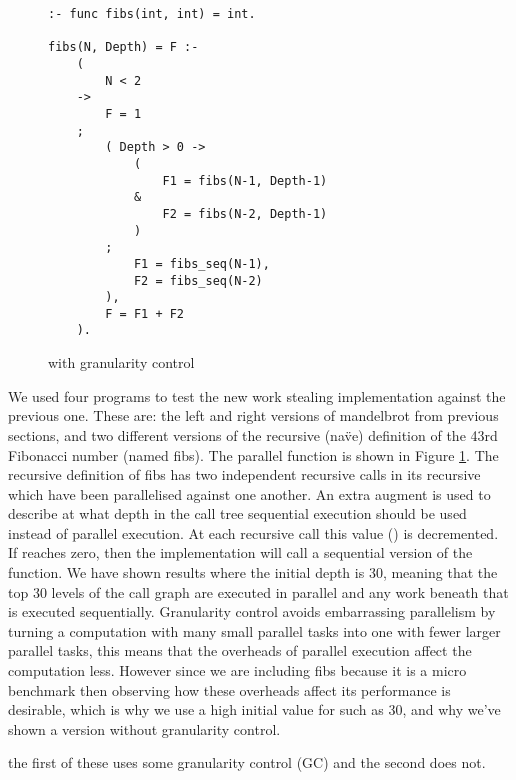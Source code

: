
\begin{figure}
\begin{verbatim}
:- func fibs(int, int) = int.

fibs(N, Depth) = F :-
    (
        N < 2
    ->
        F = 1
    ;
        ( Depth > 0 ->
            (
                F1 = fibs(N-1, Depth-1)
            &
                F2 = fibs(N-2, Depth-1)
            )
        ;
            F1 = fibs_seq(N-1),
            F2 = fibs_seq(N-2)
        ),
        F = F1 + F2
    ).
\end{verbatim}
\caption{\fibs with granularity control}
\label{fig:fibs}
\end{figure}

We used four programs to test the new work stealing implementation against
the previous one.
These are:
the left and right versions of mandelbrot from previous sections,
and two different versions of the recursive (na\"ve) definition of the 43rd
Fibonacci number (named fibs).
The parallel \fibs function is shown in Figure \ref{fig:fibs}.
The recursive definition of fibs has two independent recursive calls in its
recursive which have been parallelised against one another.
An extra augment is used to describe at what depth in the call tree
sequential execution should be used instead of parallel execution.
At each recursive call this value () is decremented.
If  reaches zero, then the implementation will call a sequential
version of the \fibs function.
We have shown results where the initial depth is 30,
meaning that the top 30 levels of the call graph are executed in parallel
and any work beneath that is executed sequentially.
Granularity control avoids embarrassing parallelism by
turning a computation with 
many small parallel tasks into one with fewer larger parallel tasks,
this means that the overheads of parallel execution affect the computation
less.
However since we are including fibs because it is a micro benchmark then
observing how these overheads affect its performance is desirable,
which is why we use a high initial value for  such as 30,
and why we've shown a version without granularity control.





the first of these uses some granularity control (GC) and the second does
not.



